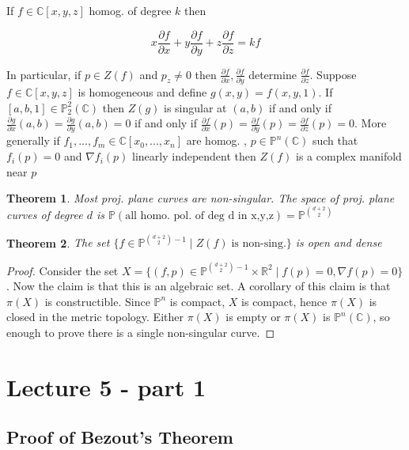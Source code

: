 \documentclass[12pt]{article}
\newtheorem{theorem}{Theorem}[section]
\theoremstyle{remark}
\newcommand{\R}{\mathbb{R}}
\newcommand{\C}{\mathbb{C}}
\begin{document}
If $f \in \C[x,y,z]$ homog. of degree $k$ then 


$$x \frac{\partial f}{\partial x} + y  \frac{\partial f}{\partial y} + z \frac{\partial f}{\partial z} = kf$$

In particular, if $p \in Z(f)$ and $p_z \neq 0$ then $\frac{\partial f}{\partial x} , \frac{\partial f}{\partial y}$ determine $\frac{\partial f}{\partial z}$. Suppose $f \in \C[x,y,z]$ is homogeneous and define $g(x,y)= f(x,y,1)$. If $[a,b,1] \in \mathbb{P}_2^2(\C)$ then $Z(g)$ is singular at $(a,b)$ if and only if $\frac{\partial g}{\partial x}(a,b) = \frac{\partial g}{\partial y}(a,b) =0$ if and only if $
\frac{\partial f}{\partial x}(p) = \frac{\partial f}{\partial y}(p) = \frac{\partial f}{\partial z}(p) = 0$. More generally if $f_1,...,f_m \in \C[x_0,...,x_n]$ are homog. , $p \in \mathbb{P}^n(\C)$ such that $f_i(p) = 0$ and $\nabla f_i(p)$ linearly independent then $Z(f)$ is a complex manifold near $p$

\begin{theorem}
Most proj. plane curves are non-singular. The space of proj. plane curves of degree $d$ is $\mathbb{P}( \text{all homo. pol. of deg d in x,y,z}) = \mathbb{P}^{\binom{d+2}{2}}$
\end{theorem}

\begin{theorem}
The set $\{ f \in \mathbb{P}^{\binom{d+2}{2} -1} \; | \; Z(f) \; \text{is non-sing.} \}$ is open and dense
\end{theorem}


\begin{proof}
Consider the set $X = \{ (f,p) \in \mathbb{P}^{\binom{d+2}{2} - 1 } \times \R^2 \; | \; f(p) = 0 , \nabla f(p) = 0 \}$. Now the claim is that this is an algebraic set. A corollary of this claim is that $\pi(X)$ is constructible. Since $\mathbb{P}^n$ is compact, $X$ is compact, hence $\pi(X)$ is closed in the metric topology. Either $\pi(X)$ is empty or $\pi(X)$ is $\mathbb{P}^n(\C)$, so enough to prove there is a single non-singular curve.
\end{proof}

\section{Lecture 5 - part 1}

\subsection{Proof of Bezout's Theorem}
\end{document}
